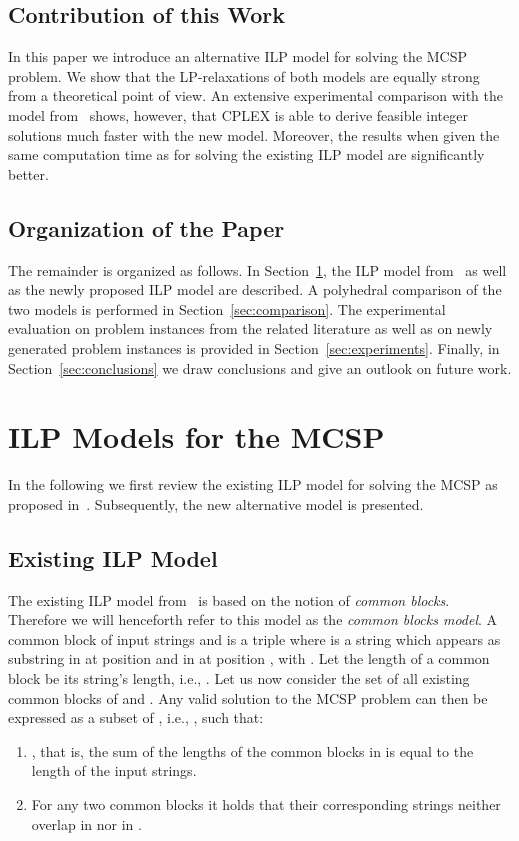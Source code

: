 \documentclass[11pt,a4paper]{article}
\begin{document}
\subsection{Contribution of this Work}

In this paper we introduce an alternative ILP model for solving the MCSP
problem. We show that the LP-relaxations of both models are
equally strong from a theoretical point of view.
An extensive experimental comparison with the model
from~\cite{BluEtAl15:ejor} shows, however, that CPLEX is able to derive 
feasible integer solutions much faster with the new model.
Moreover, the results when given the same computation time as for solving the existing ILP model are significantly better. 

\subsection{Organization of the Paper}

The remainder is organized as follows. In Section~\ref{sec:mip}, the ILP model from~\cite{BluEtAl15:ejor} as well as the newly
proposed ILP model are described. A polyhedral comparison of the two
models is performed in Section~\ref{sec:comparison}. 
The experimental evaluation on problem
instances from the related literature as well as on newly generated
problem instances is provided in Section~\ref{sec:experiments}. Finally,
in Section~\ref{sec:conclusions} we draw conclusions and give an outlook
on future work.


\section{ILP Models for the MCSP}
\label{sec:mip}

In the following we first review the existing ILP model for solving the
MCSP as proposed in~\cite{BluEtAl15:ejor}. Subsequently, the new
alternative model is presented.

\subsection{Existing ILP Model}
\label{sec:puremip}

The existing ILP model from~\cite{BluEtAl15:ejor} is based on the notion of \emph{common blocks}. Therefore we will henceforth refer to this model as the \emph{common blocks model}. A common block  of input strings  and  is a
triple  where  is a string which appears
as substring in  at position  and in 
at position , with . 
Let the length of a common block  be its string's length, i.e., .
Let us now consider the set  of all existing
common blocks of  and .
Any valid solution  to the MCSP problem can then be
expressed as a subset of , i.e., , such that:
\begin{enumerate}
  \item , that is, the sum of the
  lengths of the common blocks in  is equal to the length
  of the input strings.
  \item For any two common blocks  it holds that their corresponding strings neither overlap in  nor in .
\end{enumerate}
\end{document}
